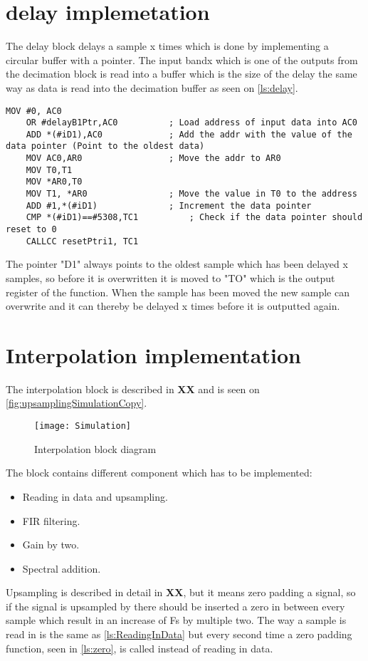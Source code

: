\section{delay implemetation}
The delay block delays a sample x times which is done by implementing a circular buffer with a pointer. The input bandx which is one of the outputs from the decimation block is read into a buffer which is the size of the delay the same way as data is read into the decimation buffer as seen on \autoref{ls:delay}.  

\begin{lstlisting}[language={[x86masm]Assembler}, caption = {Delay algorithm.},label={ls:delay}]
	MOV #0, AC0
	OR #delayB1Ptr,AC0			; Load address of input data into AC0
	ADD *(#iD1),AC0				; Add the addr with the value of the data pointer (Point to the oldest data)
	MOV AC0,AR0					; Move the addr to AR0
	MOV T0,T1
	MOV *AR0,T0	
	MOV T1, *AR0				; Move the value in T0 to the address
	ADD #1,*(#iD1)				; Increment the data pointer
	CMP *(#iD1)==#5308,TC1			; Check if the data pointer should reset to 0
	CALLCC resetPtri1, TC1		
\end{lstlisting}

The pointer "D1" always points to the oldest sample which has been delayed x samples, so before it is overwritten it is moved to "TO" which is the output register of the function. When the sample has been moved the new sample can overwrite and it can thereby be delayed x times before it is outputted again.

\section{Interpolation implementation}
The interpolation block is described in \textbf{XX} and is seen on \autoref{fig:upsamplingSimulationCopy}.
\begin{figure}[H]
    \centering
	\texttt{[image: Simulation]}
    \caption{Interpolation block diagram}
    \label{fig:upsamplingSimulationCopy}
\end{figure}
The block contains different component which has to be implemented:
\begin{itemize}
\item Reading in data and upsampling.
\item FIR filtering.
\item Gain by two.
\item Spectral addition.
\end{itemize}
Upsampling is described in detail in \textbf{XX}, but it means zero padding a signal, so if the signal is upsampled by there should be inserted a zero in between every sample which result in an increase of Fs by multiple two. The way a sample is read in is the same as \autoref{ls:ReadingInData} but every second time a zero padding function, seen in \autoref{ls:zero}, is called instead of reading in data.  


